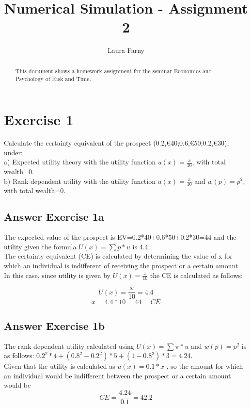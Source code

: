 \documentclass[12pt]{article}
\begin{document}
	
\title{Numerical Simulation - Assignment 2}
\author{Laura Farny}

{}


\begin{abstract}
	This document shows a homework assignment for the seminar Economics and Psychology of Risk and Time.
	
\end{abstract}

\section{Exercise 1}
Calculate the certainty equivalent of the prospect (0.2,€40;0.6,€50;0.2,€30), under: \\
a) Expected utility theory with the utility function \(u(x) = \frac{x}{10}\), with total wealth=0. \\
b) Rank dependent utility with the utility function \(u(x) = \frac{x}{10}\) and \(w(p) = p^{2}\), with total wealth=0.

\subsection{Answer Exercise 1a}
The expected value of the prospect is EV=0.2*40+0.6*50+0.2*30=44 and the utility given the formula \(U(x)=\sum p*u\) is 4.4.\\
The certainty equivalent (CE) is calculated by determining the value of x for which an individual is indifferent of receiving the prospect or a certain amount. In this case, since utility is given by \(U(x)=\frac{x}{10}\)  the CE is calculated as follows:


\[U(x)=\frac{x}{10}=4.4\]
\[x=4.4*10=44=CE\]

\subsection{Answer Exercise 1b}

The rank dependent utility calculated using \(U(x)=\sum \pi *u\) and \(w(p)=p^{2}\) is as follows: \(0.2^{2}*4 + (0.8^{2}-0.2^{2})*5 + (1-0.8^{2})*3 = 4.24\). \\
Given that the utility is calculated as \(u(x)=0.1*x\) , so the amount for which an individual would be indifferent between the prospect or a certain amount would be \[CE=\frac{4.24}{0.1}=42.2\]
\end{document}
